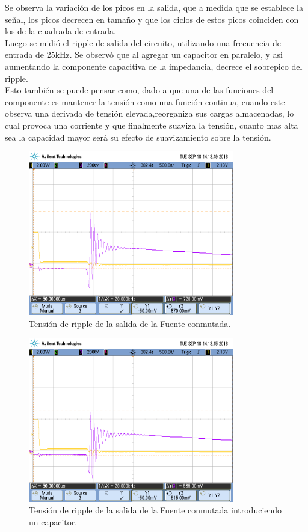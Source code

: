 Se observa la variación de los picos en la salida, que a medida que se establece la señal, los picos decrecen en tamaño y que los ciclos de estos picos coinciden con los de la cuadrada de entrada.\\
Luego se midió el ripple de salida del circuito, utilizando una frecuencia de entrada de 25kHz. Se observó que al agregar un capacitor en paralelo, y asi aumentando la componente capacitiva de la impedancia, decrece el sobrepico del ripple.\\Esto también se puede  pensar como, dado a que una de las funciones del componente es mantener la tensión como una función  continua, cuando  este observa una derivada de tensión elevada,reorganiza sus cargas almacenadas, lo cual provoca una corriente y que finalmente suaviza la tensión, cuanto mas alta sea la capacidad mayor será su efecto de suavizamiento sobre la tensión.
\begin{figure}[H]
	\centering
	\includegraphics[width=0.8\textwidth]{Imagenes/ripple_.png}
\caption{Tensión de ripple de la salida de la Fuente conmutada.}
	\label{fig:fconr}
\end{figure}
\begin{figure}[H]
	\centering
	\includegraphics[width=0.8\textwidth]{Imagenes/ripple_c.png}
\caption{Tensión de ripple de la salida de la Fuente conmutada introduciendo un capacitor.}
	\label{fig:fconrc}
\end{figure}

